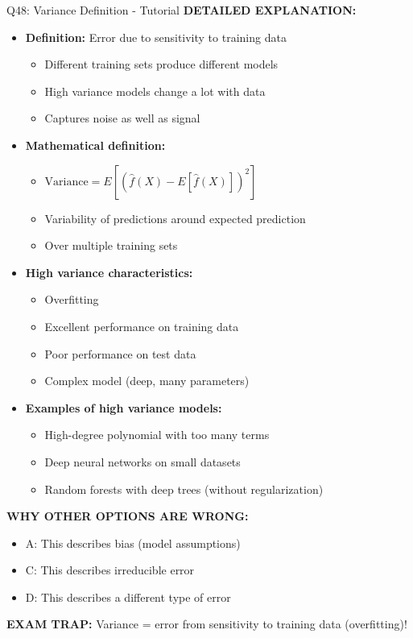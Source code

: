 \documentclass[8pt]{beamer}
\begin{document}
\begin{frame}{Q48: Variance Definition - Tutorial}
		\vspace{0.05cm}
		\textbf{DETAILED EXPLANATION:}
		\begin{itemize}
			\item \textbf{Definition:} Error due to sensitivity to training data
			\begin{itemize}
				\item Different training sets produce different models
				\item High variance models change a lot with data
				\item Captures noise as well as signal
			\end{itemize}
			\item \textbf{Mathematical definition:}
			\begin{itemize}
				\item $\text{Variance} = E[(\hat{f}(X) - E[\hat{f}(X)])^2]$
				\item Variability of predictions around expected prediction
				\item Over multiple training sets
			\end{itemize}
			\item \textbf{High variance characteristics:}
			\begin{itemize}
				\item Overfitting
				\item Excellent performance on training data
				\item Poor performance on test data
				\item Complex model (deep, many parameters)
			\end{itemize}
			\item \textbf{Examples of high variance models:}
			\begin{itemize}
				\item High-degree polynomial with too many terms
				\item Deep neural networks on small datasets
				\item Random forests with deep trees (without regularization)
			\end{itemize}
		\end{itemize}
		
		\vspace{0.05cm}
		\textcolor{myred}{\textbf{WHY OTHER OPTIONS ARE WRONG:}}
		\begin{itemize}
			\item \textcolor{myred}{A:} This describes bias (model assumptions)
			\item \textcolor{myred}{C:} This describes irreducible error
			\item \textcolor{myred}{D:} This describes a different type of error
		\end{itemize}
		
		\textcolor{myred}{\textbf{EXAM TRAP:}} Variance = error from sensitivity to training data (overfitting)!
	\end{frame}
	
\end{document}
